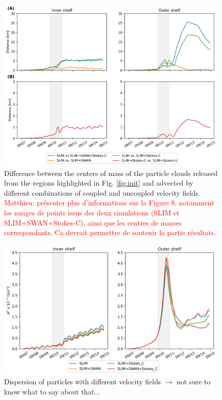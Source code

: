 \documentclass[preprint,12pt,authoryear]{elsarticle}
\begin{document}

\begin{figure}
    \centering
    \includegraphics[width=.99\textwidth]{fig/inner_outer.png}
    \caption{Difference between the centers of mass of the particle clouds released from the regions highlighted in Fig. \ref{fig:init} and advected by different combinations of coupled and uncoupled velocity fields. \textcolor{red}{Matthieu: présenter plus d'informations sur la Figure 8, notamment les nuages de points issus des deux simulations (SLIM et SLIM+SWAN+Stokes-C), ainsi que les centres de masses correspondants. Ca devrait permettre de soutenir la partie résultats.}}
    \label{fig:traj}
\end{figure}

\begin{figure}
    \centering
    \includegraphics[width=.98\textwidth]{fig/dispersion.png}
    \caption{Dispersion of particles with different velocity fields $\rightarrow$ not sure to know what to say about that...}   
    \label{fig:dispersion}
\end{figure}
\end{document}
